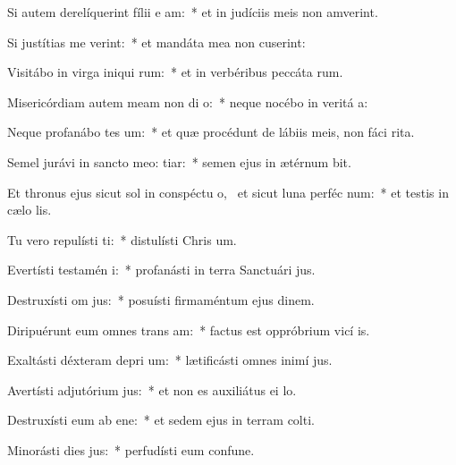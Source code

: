 \item Si autem derelíquerint fílii e  am:~* et in judíciis meis non amverint.
\item Si justítias me verint:~* et mandáta mea non cuserint:
\item Visitábo in virga iniqui rum:~* et in verbéribus peccáta rum.
\item Misericórdiam autem meam non di  o:~* neque nocébo in veritá a:
\item Neque profanábo tes um:~* et quæ procédunt de lábiis meis, non fáci rita.
\item Semel jurávi in sancto meo:   tiar:~* semen ejus in ætérnum bit.
\item Et thronus ejus sicut sol in conspéctu o,~\pscross{} et sicut luna perféc  num:~* et testis in cælo lis.
\item Tu vero repulísti  ti:~* distulísti Chris um.
\item Evertísti testamén  i:~* profanásti in terra Sanctuári jus.
\item Destruxísti om  jus:~* posuísti firmaméntum ejus dinem.
\item Diripuérunt eum omnes trans am:~* factus est oppróbrium vicí is.
\item Exaltásti déxteram depri um:~* lætificásti omnes inimí jus.
\item Avertísti adjutórium  jus:~* et non es auxiliátus ei  lo.
\item Destruxísti eum ab ene:~* et sedem ejus in terram colti.
\item Minorásti dies  jus:~* perfudísti eum confune.
